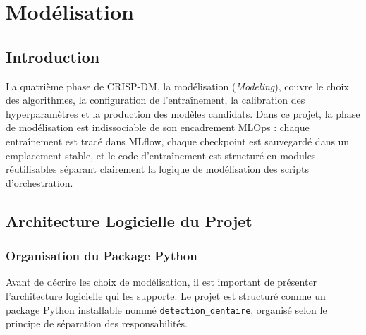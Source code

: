 \documentclass{rapportENSIAS}
\begin{document}
\chapter{Modélisation}
\label{chap:modeling}

\section{Introduction}

La quatrième phase de CRISP-DM, la modélisation (\textit{Modeling}), couvre
le choix des algorithmes, la configuration de l'entraînement, la calibration
des hyperparamètres et la production des modèles candidats. Dans ce projet,
la phase de modélisation est indissociable de son encadrement MLOps : chaque
entraînement est tracé dans MLflow, chaque checkpoint est sauvegardé dans un
emplacement stable, et le code d'entraînement est structuré en modules réutilisables
séparant clairement la logique de modélisation des scripts d'orchestration.

\section{Architecture Logicielle du Projet}

\subsection{Organisation du Package Python}

Avant de décrire les choix de modélisation, il est important de présenter
l'architecture logicielle qui les supporte. Le projet est structuré comme un
package Python installable nommé \texttt{detection\_dentaire}, organisé selon
le principe de séparation des responsabilités.
\end{document}

